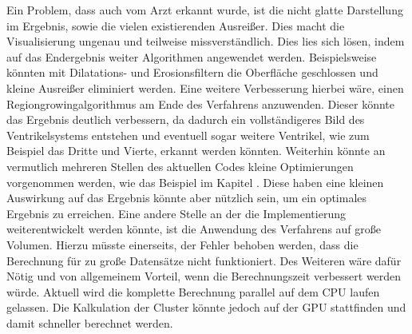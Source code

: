 \newline
Ein Problem, dass auch vom Arzt erkannt wurde, ist die nicht glatte Darstellung im Ergebnis, sowie die vielen existierenden Ausreißer. Dies macht die Visualisierung ungenau und teilweise missverständlich.
\newline
Dies lies sich lösen, indem auf das Endergebnis weiter Algorithmen angewendet werden. Beispielsweise könnten mit Dilatations- und Erosionsfiltern die Oberfläche geschlossen und kleine Ausreißer eliminiert werden. Eine weitere Verbesserung hierbei wäre, einen Regiongrowingalgorithmus am Ende des Verfahrens anzuwenden. Dieser könnte das Ergebnis deutlich verbessern, da dadurch ein vollständigeres Bild des Ventrikelsystems entstehen und eventuell sogar weitere Ventrikel, wie zum Beispiel das Dritte und Vierte, erkannt werden könnten.
\newline
Weiterhin könnte an vermutlich mehreren Stellen des aktuellen Codes kleine Optimierungen vorgenommen werden, wie das Beispiel im Kapitel . Diese haben eine kleinen Auswirkung auf das Ergebnis könnte aber nützlich sein, um ein optimales Ergebnis zu erreichen.
\newline
Eine andere Stelle an der die Implementierung weiterentwickelt werden könnte, ist die Anwendung des Verfahrens auf große Volumen. Hierzu müsste einerseits, der Fehler behoben werden, dass die Berechnung für zu große Datensätze nicht funktioniert. Des Weiteren wäre dafür Nötig und von allgemeinem Vorteil, wenn die Berechnungszeit verbessert werden würde. Aktuell wird die komplette Berechnung parallel auf dem CPU laufen gelassen. Die Kalkulation der Cluster könnte jedoch auf der GPU stattfinden und damit schneller berechnet werden.

